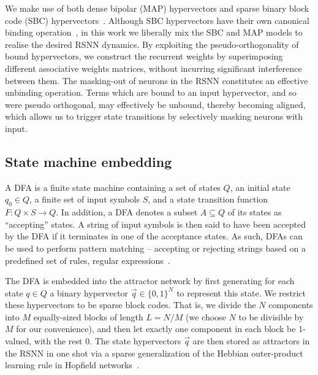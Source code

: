 We make use of both dense bipolar (MAP) hypervectors and sparse binary block code (SBC) hypervectors~\cite{laiho_high-dimensional_2015, gayler_multiplicative_1998, kleyko_survey_2022}. Although SBC hypervectors have their own canonical binding operation~\cite{frady_variable_2023}, in this work we liberally mix the SBC and MAP models to realise the desired RSNN dynamics. By exploiting the pseudo-orthogonality of bound hypervectors, we construct the recurrent weights by superimposing different associative weights matrices, without incurring significant interference between them. The masking-out of neurons in the RSNN constitutes an effective unbinding operation. Terms which are bound to an input hypervector, and so were pseudo orthogonal, may effectively be unbound, thereby becoming aligned, which allows us to trigger state transitions by selectively masking neurons with input.


\subsection{State machine embedding}

A DFA is a finite state machine containing a set of states $Q$, an initial state $q_0 \in Q$, a finite set of input symbols $S$, and a state transition function $F: Q \times S \rightarrow Q$. In addition, a DFA denotes a subset $A \subseteq Q$ of its states as ``accepting'' states. A string of input symbols is then said to have been accepted by the DFA if it terminates in one of the acceptance states. As such, DFAs can be used to perform pattern matching -- accepting or rejecting strings based on a predefined set of rules, regular expressions~\cite{minsky_computation_1967}.


The DFA is embedded into the attractor network by first generating for each state $q \in Q$ a binary hypervector $\vec{q} \in \{0,1\}^N$ to represent this state. We restrict these hypervectors to be sparse block codes. That is, we divide the $N$ components into $M$ equally-sized blocks of length $L = N/M$ (we choose $N$ to be divisible by $M$ for our convenience), and then let exactly one component in each block be $1$-valued, with the rest $0$. The state hypervectors $\vec{q}$ are then stored as attractors in the RSNN in one shot via a sparse generalization of the Hebbian outer-product learning rule in Hopfield networks~\cite{amari_characteristics_1989, tsodyks_enhanced_1988, knoblauch_memory_2010}.

